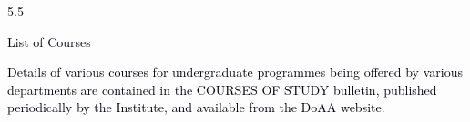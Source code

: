 \documentclass[12pt]{article}
\begin{document}
\vspace{\baselineskip}
\textcolor[HTML]{00000A}{5.5 \tabto{0.36in} }{\fontsize{10pt}{12.0pt}\selectfont \textcolor[HTML]{00000A}{List of Courses}\par}\par


\vspace{\baselineskip}
\begin{adjustwidth}{0.0in}{0.01in}
\begin{justify}
{\fontsize{10pt}{12.0pt}\selectfont \textcolor[HTML]{00000A}{Details of various courses for undergraduate programmes being offered by various departments are contained in the COURSES OF STUDY bulletin, published periodically by the Institute, and available from the DoAA website.}\par}
\end{justify}\par

\end{adjustwidth}


\vspace{\baselineskip}

\vspace{\baselineskip}

\vspace{\baselineskip}

\vspace{\baselineskip}

\vspace{\baselineskip}

\vspace{\baselineskip}

\vspace{\baselineskip}

\vspace{\baselineskip}

\vspace{\baselineskip}

\vspace{\baselineskip}

\vspace{\baselineskip}

\vspace{\baselineskip}

\vspace{\baselineskip}

\vspace{\baselineskip}

\vspace{\baselineskip}
\end{document}

